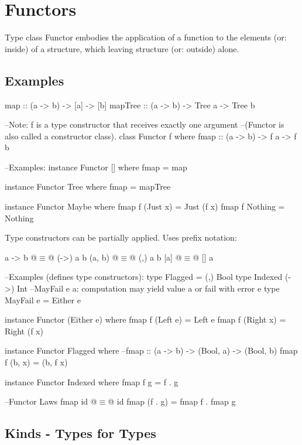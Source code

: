 
\section{Functors}
Type class Functor embodies the application of a function to the elements (or: inside) of a structure, which leaving structure (or: outside) alone.

\subsection{Examples}
\begin{Haskell}
map :: (a -> b) -> [a] -> [b]
mapTree :: (a -> b) -> Tree a -> Tree b

--Note: f is a type constructor that receives exactly one argument
--(Functor is also called a constructor class).
class Functor f where
   fmap :: (a -> b) -> f a -> f b
   
--Examples:
instance Functor [] where
   fmap = map
   
instance Functor Tree where
   fmap = mapTree
   
instance Functor Maybe where
   fmap f (Just x) = Just (f x)
   fmap f Nothing  = Nothing
\end{Haskell}

\begin{minipage}{\textwidth}
Type constructors can be partially applied. Uses prefix notation:\\
\begin{Haskell}
a -> b @$\equiv$@ (->) a b
(a, b) @$\equiv$@ (,) a b
[a] @$\equiv$@ [] a

--Examples (defines type constructors):
type Flagged = (,) Bool
type Indexed (->) Int
--MayFail e a: computation may yield value a or fail with error e
type MayFail e = Either e

instance Functor (Either e) where
   fmap f (Left e)  = Left e
   fmap f (Right x) = Right (f x)
   
instance Functor Flagged where
--fmap :: (a -> b) -> (Bool, a) -> (Bool, b)
   fmap f (b, x) = (b, f x)
   
instance Functor Indexed where
   fmap f g = f . g

--Functor Laws
fmap id @$\equiv$@ id
fmap (f . g) = fmap f . fmap g
\end{Haskell}
\end{minipage}

\subsection{Kinds - Types for Types}

